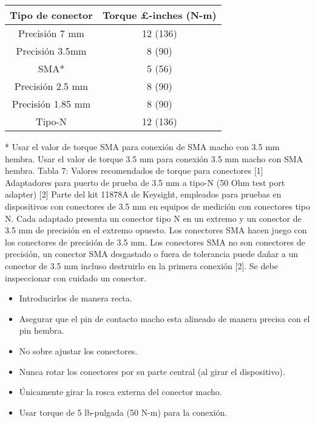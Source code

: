 \begin{table}[h!]
	\centering
	\begin{tabular}{cc}
		\toprule
		{\bfseries Tipo de conector} 		& {\bfseries Torque \si{\pounds}-inches (\si{\newton}-\si{\meter})} 	\\
		\midrule
		Precisión 7 \si{\milli\meter} 		& 	12 (136) 		\\
		Precisión 3.5\si{\milli\meter}		& 	8 (90)			\\
		SMA*								& 	5 (56)			\\
		Precisión 2.5 \si{\milli\meter}		& 	8 (90)			\\
		Precisión 1.85 \si{\milli\meter}	& 	8 (90)			\\
		Tipo-N								&	12 (136)		\\		
		\bottomrule
	\end{tabular}
\end{table}

* Usar el valor de torque SMA para conexión de SMA macho con 3.5 mm hembra. Usar el valor de torque 3.5 mm para conexión 3.5 mm macho con SMA hembra.
Tabla 7: Valores recomendados de torque para conectores [1]
Adaptadores para puerto de prueba de 3.5 mm a tipo-N (50 Ohm test port adapter) [2]
Parte del kit 11878A de Keysight, empleados para pruebas en dispositivos con conectores de 3.5 mm en equipos de medición con conectores tipo N. Cada adaptado presenta un conector tipo N en un extremo y un conector de 3.5 mm de precisión en el extremo opuesto.
Los conectores SMA hacen juego con los conectores de precisión de 3.5 mm. Los conectores SMA no son conectores de precisión, un conector SMA desgastado o fuera de tolerancia puede dañar a un conector de 3.5 mm incluso destruirlo en la primera conexión [2]. Se debe inspeccionar con cuidado un conector.

\begin{itemize}
	\item Introducirlos de manera recta.
	\item Asegurar que el pin de contacto macho esta alineado de manera precisa con el pin hembra.
	\item No sobre ajustar los conectores.
	\item Nunca rotar los conectores por su parte central (al girar el dispositivo).
	\item Únicamente girar la rosca externa del conector macho.
	\item Usar torque de 5 lb-pulgada (50 \si{\newton}-\si{\meter}) para la conexión.

\end{itemize}

